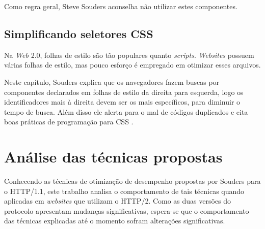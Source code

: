 Como regra geral, Steve Souders aconselha não utilizar estes componentes.

\subsection{Simplificando seletores CSS}
\label{subsec:evenfaster_cap14}
Na \textit{Web} 2.0, folhas de estilo são tão populares quanto \textit{scripts}. \textit{Websites} possuem várias folhas de estilo, mas pouco esforço é empregado em otimizar esses arquivos.

Neste capítulo, Souders explica que os navegadores fazem buscas por componentes declarados em folhas de estilo da direita para esquerda, logo os identificadores mais à direita devem ser os mais específicos, para diminuir o tempo de busca. Além disso ele alerta para o mal de códigos duplicados e cita boas práticas de programação para CSS \cite[p.~195]{EvenFaster}.

\section{Análise das técnicas propostas}
Conhecendo as técnicas de otimização de desempenho propostas por Souders para o HTTP/1.1, este trabalho analisa o comportamento de tais técnicas quando aplicadas em \textit{websites} que utilizam o HTTP/2. Como as duas versões do protocolo apresentam mudanças significativas, espera-se que o comportamento das técnicas explicadas até o momento sofram alterações significativas.
